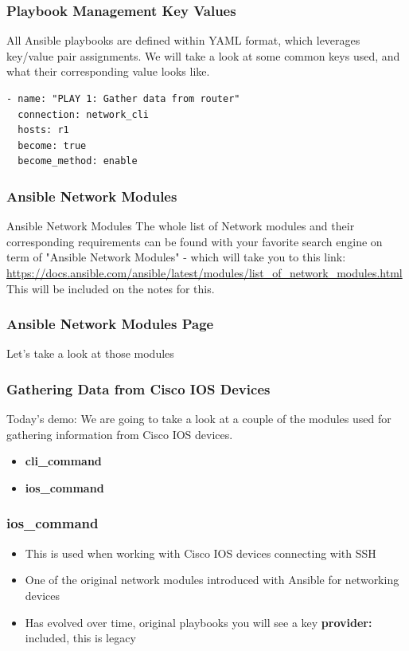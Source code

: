 \documentclass{beamer}
\begin{document}
\begin{frame}[fragile]
    \frametitle{Playbook Management Key Values}
    All Ansible playbooks are defined within YAML format, which leverages key/value
    pair assignments. We will take a look at some common keys used, and what their
    corresponding value looks like.
\begin{verbatim}
- name: "PLAY 1: Gather data from router"
  connection: network_cli
  hosts: r1
  become: true
  become_method: enable
\end{verbatim}
\end{frame}

\begin{frame}
  \frametitle{Ansible Network Modules}
  \begin{block}{Ansible Network Modules}
    The whole list of Network modules and their corresponding requirements
    can be found with your favorite search engine on term of "Ansible Network Modules" 
    - which will take you to this link: \url{https://docs.ansible.com/ansible/latest/modules/list_of_network_modules.html}
    This will be included on the notes for this.
    \end{block}
\end{frame}

\begin{frame}
  \frametitle{Ansible Network Modules Page}
    Let's take a look at those modules
\end{frame}

\begin{frame}
    \frametitle{Gathering Data from Cisco IOS Devices}
    Today's demo: We are going to take a look at a couple of the modules used
    for gathering information from Cisco IOS devices. 
    \begin{itemize}
        \item<2-> \textbf{cli\_command}
        \item<3-> \textbf{ios\_command}
    \end{itemize}
\end{frame}

\begin{frame}
    \frametitle{ios\_command}
    \begin{itemize}
      \item <1-> This is used when working with Cisco IOS devices connecting with SSH
      \item <2-> One of the original network modules introduced with Ansible for networking devices
      \item <3-> Has evolved over time, original playbooks you will see a key \textbf{provider:} included, this is legacy
    \end{itemize}
\end{frame}
\end{document}
